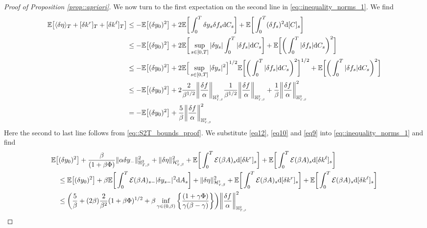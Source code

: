 \documentclass[10pt]{article} %
\newcommand\cE{\mathcal E}
\newcommand\cH{\mathcal H}
\newcommand{\smalltext}[1]{\text{\fontsize{4}{4}\selectfont$#1$}}
\def \E{\mathbb{E}}
\def \H{\mathbb{H}}
\newcommand{\1}{\mathbf{1}}
\def\d{\mathrm{d}}
\begin{document}
\begin{proof}[Proof of Proposition \ref{prop::apriori}]
\medskip
We now turn to the first expectation on the second line in \eqref{eq::inequality_norms_1}. We find
\begin{align}\label{eq12}
	\E \big[ \langle \delta\eta \rangle_T + [\delta k^r]_T + [\delta k^\ell]_T \big] 
	&\leq -\E\big[(\delta y_0)^2\big] + 2 \E\bigg[\int_0^T\delta y_{s}\delta f_s \d C_s\bigg]  + \E\bigg[\int_0^T(\delta f_s)^2\d[C]_s\bigg] \nonumber\\
	&\leq -\E\big[(\delta y_0)^2\big] + 2 \E\bigg[\sup_{s \in [0,T]}|\delta y_s|\int_0^T|\delta f_s| \d C_s\bigg]  + \E\bigg[\bigg(\int_0^T|\delta f_s|\d C_s\bigg)^2\bigg] \nonumber\\
	&\leq -\E\big[(\delta y_0)^2\big] + 2 \E\Big[\sup_{s \in [0,T]}|\delta y_s|^2\Big]^{1/2}\E\bigg[\bigg(\int_0^T |\delta f_s|\d C_s\bigg)^2\bigg]^{1/2} + \E\bigg[\bigg(\int_0^T|\delta f_s|\d C_s\bigg)^2\bigg] \nonumber\\
	&\leq -\E\big[(\delta y_0)^2\big] + 2 \frac{2}{\beta^{1/2}} \bigg\|\frac{\delta f}{\alpha}\bigg\|_{\H^2_{\smalltext{T}\smalltext{,}\smalltext{\beta}}}  \frac{1}{\beta^{1/2}}\bigg\|\frac{\delta f}{\alpha}\bigg\|_{\H^\smalltext{2}_{\smalltext{T}\smalltext{,}\smalltext{\beta}}} + \frac{1}{\beta} \bigg\|\frac{\delta f}{\alpha} \bigg\|^2_{\H^\smalltext{2}_{\smalltext{T}\smalltext{,}\smalltext{\beta}}} \nonumber\\
	&= -\E\big[(\delta y_0)^2\big] + \frac{5}{\beta} \bigg\|\frac{\delta f}{\alpha}\bigg\|^2_{\H^\smalltext{2}_{\smalltext{T}\smalltext{,}\smalltext{\beta}}}
\end{align}
Here the second to last line follows from \eqref{eq::S2T_bounds_proof}. We substitute \eqref{eq12}, \eqref{eq10} and \eqref{eq9} into \eqref{eq::inequality_norms_1} and find
\begin{align*}
	&\E\big[(\delta y_0)^2\big] + \frac{\beta}{(1+\beta\Phi)}\|\alpha\delta y_{-}\|^2_{\H^2_{T,\beta}} + \|\delta\eta\|^2_{\cH^\smalltext{2}_{\smalltext{T}\smalltext{,}\beta}} + \E\bigg[\int_0^T \cE(\beta A)_s \d[\delta k^r]_s\bigg] + \E\bigg[\int_0^T \cE(\beta A)_s \d[\delta k^\ell]_s\bigg] \\
	&\quad\leq \E\big[(\delta y_0)^2\big] + \beta\E\bigg[\int_0^T\cE(\beta A)_{s-}|\delta y_{s-}|^2 \d A_s\bigg] + \|\delta\eta\|^2_{\cH^\smalltext{2}_{\smalltext{T}\smalltext{,}\beta}} + \E\bigg[\int_0^T \cE(\beta A)_s \d[\delta k^r]_s\bigg] + \E\bigg[\int_0^T \cE(\beta A)_s \d[\delta k^\ell]_s\bigg] \\
	&\quad\leq \bigg( \frac{5}{\beta} + (2\beta)\frac{2}{\beta^2}(1+\beta\Phi)^{1/2} + \beta \inf_{\gamma \in (0,\beta)}\bigg\{\frac{(1+\gamma\Phi)}{\gamma(\beta-\gamma)}\bigg\}  \bigg)\bigg\|\frac{\delta f}{\alpha}\bigg\|^2_{\H^\smalltext{2}_{\smalltext{T}\smalltext{,}\smalltext{\beta}}} \\

\end{align*}
\end{proof}
\end{document}
